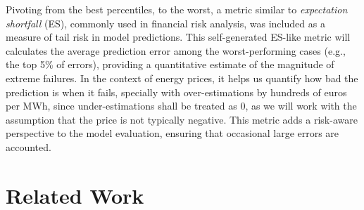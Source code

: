 \documentclass[12pt]{report} %
\begin{document}
Pivoting from the best percentiles, to the worst, a metric similar to \textit{expectation shortfall} (ES), commonly used in financial risk analysis, was included as a measure of tail risk in model predictions. This self-generated ES-like metric will calculates the average prediction error among the worst-performing cases (e.g., the top 5\% of errors), providing a quantitative estimate of the magnitude of extreme failures. In the context of energy prices, it helps us quantify how bad the prediction is when it fails, specially with over-estimations by hundreds of euros per MWh, since under-estimations shall be treated as 0, as we will work with the assumption that the price is not typically negative. This metric adds a risk-aware perspective to the model evaluation, ensuring that occasional large errors are accounted.



\section{Related Work}




\end{document}
